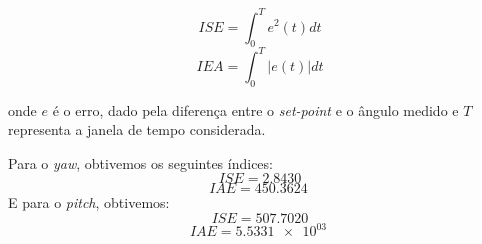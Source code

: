  \begin{equation}\label{eq:ISE}
     ISE = \int_{0}^{T} e^{2}(t) dt
 \end{equation}
 \begin{equation}\label{eq:IEA}
     IEA = \int_{0}^{T} |e(t)| dt
 \end{equation}

\noindent onde $e$ é o erro, dado pela diferença entre o \textit{set-point} e o ângulo medido e $T$ representa a janela de tempo considerada.
 
Para o \textit{yaw}, obtivemos os seguintes índices:
$$ISE = 2.8430 $$
$$IAE = \SI{450.3624}{} $$
E para o \textit{pitch}, obtivemos:
$$ISE = 507.7020 $$
$$IAE = \SI{5.5331e+03}{} $$


